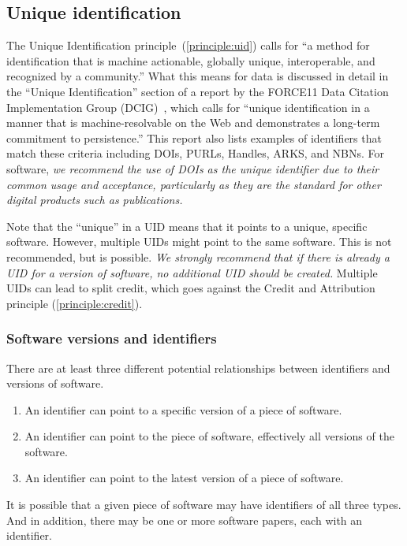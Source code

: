 \documentclass[12pt, oneside]{amsart}
\newcommand{\katznote}[1]{ {\textcolor{blue} { ***DSK: #1 }}} %
\newcommand{\LJHnote}[1]{ {\textcolor{fuschsia} { ***LJH: #1 }}} %
\begin{document}
\subsection{Unique identification}
\label{sec:identification}

The Unique Identification principle~(\ref{principle:uid}) calls for ``a method for identification that is machine actionable, globally unique, interoperable, and recognized by a community.''
What this means for data is discussed in detail in the ``Unique Identification'' section of a report by the FORCE11 Data Citation Implementation Group (DCIG)~\cite{10.7717/peerj-cs.1}, which calls for ``unique identification in a manner that is machine-resolvable on the Web and demonstrates a long-term commitment to persistence.''
This report also lists examples of identifiers that match these criteria including DOIs, PURLs, Handles, ARKS, and NBNs.
For software, \textit{we recommend the use of DOIs as the unique identifier due to their common usage and acceptance, particularly as they are the standard for other digital products such as publications.}

Note that the ``unique'' in a UID means that it points to a unique, specific software. However, multiple UIDs might point to the same software.
This is not recommended, but is possible.
\textit{We strongly recommend that if there is already a UID for a version of software, no additional UID should be created.}
Multiple UIDs can lead to split credit, which goes against the Credit and Attribution principle (\ref{principle:credit}).


\subsubsection*{Software versions and identifiers}

There are at least three different potential relationships between identifiers and versions of software.
\begin{enumerate}
\item An identifier can point to a specific version of a piece of software.
\item An identifier can point to the piece of software, effectively all versions of the software.
\item An identifier can point to the latest version of a piece of software.
\end{enumerate}
It is possible that a given piece of software may have identifiers of all three types.  And in addition,
there may be one or more software papers, each with an identifier.
\end{document}
